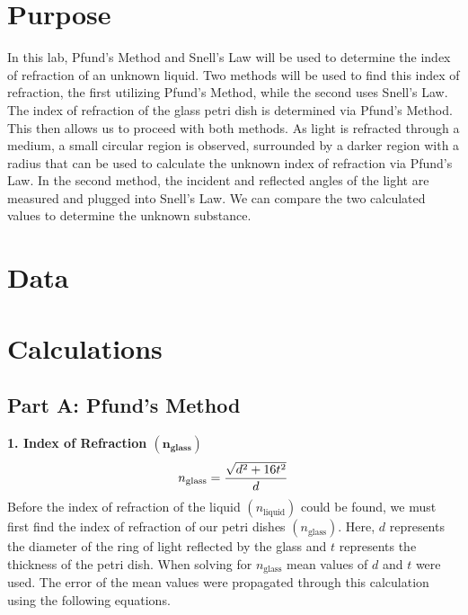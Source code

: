 \documentclass[12pt]{article}
\begin{document}

\newpage
\tableofcontents
\newpage
\section{Purpose}
In this lab, Pfund's Method and Snell's Law will be used to determine the index of refraction of an unknown liquid. 
Two methods will be used to find this index of refraction, the first utilizing Pfund's Method, while the second uses Snell's Law.
The index of refraction of the glass petri dish is determined via Pfund's Method. This then allows us to proceed with both methods. 
As light is refracted through a medium, a small circular region is observed, surrounded by a darker region with a radius that can be used to calculate the unknown index of refraction via Pfund's Law.
In the second method, the incident and reflected angles of the light are measured and plugged into Snell's Law. We can compare the two calculated values to determine the unknown substance.
\newpage
\section{Data}

\newpage
\section{Calculations}
\subsection*{Part A: Pfund's Method}
\noindent \textbf{1. Index of Refraction $\bm{({n_{\textbf{glass}}})}$}\[n_{\textnormal{glass}}=\frac{\sqrt{d^2+16t^2}}{d}\]
    Before the index of refraction of the liquid $(n_\text{liquid})$ could be found, we must first find the index of refraction of our petri dishes $(n_\text{glass})$. Here, $d$ represents the diameter of the ring of light reflected by the glass and $t$ represents the thickness of the petri dish. When solving for $n_\text{glass}$ mean values of $d$ and $t$ were used. The error of the mean values were propagated through this calculation using the following equations. 
\end{document}
